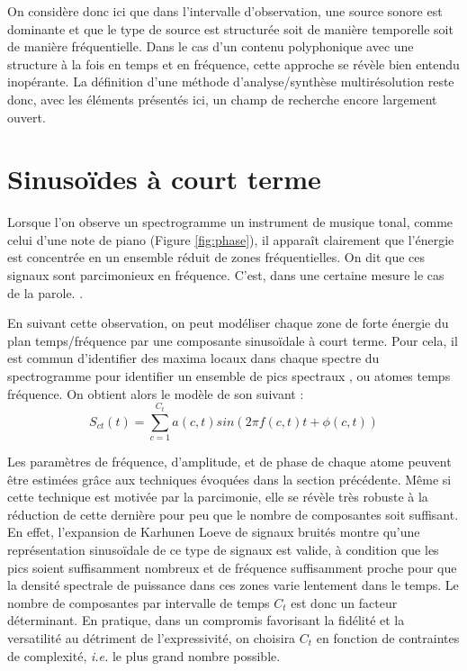 On considère donc ici que dans l'intervalle d'observation, une source sonore est dominante et que le type de source est structurée soit de manière temporelle soit de manière fréquentielle. Dans le cas d'un contenu polyphonique avec une structure à la fois en temps et en fréquence, cette approche se révèle bien entendu inopérante. La définition d'une méthode d'analyse/synthèse multirésolution reste donc, avec les éléments présentés ici, un champ de recherche encore largement ouvert.

\section{ \nmu Sinusoïdes à court terme}  \label{sec:sct}

Lorsque l'on observe un spectrogramme un instrument de musique tonal, comme celui d'une note de piano (Figure \ref{fig:phase}), il apparaît clairement que l'énergie est concentrée en un ensemble réduit de zones fréquentielles. On dit que ces signaux sont parcimonieux en fréquence. C'est, dans une certaine mesure le cas de la parole. .

En suivant cette observation, on peut modéliser chaque zone de forte énergie du plan temps/fréquence par une composante sinusoïdale à court terme. Pour cela, il est commun d'identifier des maxima locaux dans chaque spectre du spectrogramme pour identifier un ensemble de \og pics spectraux \fg, ou \og atomes \fg temps fréquence. On obtient alors le modèle de son suivant :
\begin{equation}
  S_{ct}(t) = \sum_{c=1}^{C_t} a(c,t) sin(2 \pi f(c,t) t + \phi(c,t))
\end{equation}

Les paramètres de fréquence, d'amplitude, et de phase de chaque atome peuvent être estimées grâce aux techniques évoquées dans la section précédente. Même si cette technique est motivée par la parcimonie, elle se révèle très robuste à la réduction de cette dernière pour peu que le nombre de composantes soit suffisant. En effet, l'expansion de Karhunen Loeve de signaux bruités montre qu'une représentation sinusoïdale de ce type de signaux est valide, à condition que les pics soient suffisamment nombreux et de fréquence suffisamment proche pour que la densité spectrale de puissance dans ces zones varie lentement dans le temps\cite{mcaulay}. Le nombre de composantes par intervalle de temps $C_t$ est donc un facteur déterminant. En pratique, dans un compromis favorisant la fidélité et la versatilité au détriment de l'expressivité, on choisira $C_t$ en fonction de contraintes de complexité, \textit{i.e.} le plus grand nombre possible.

